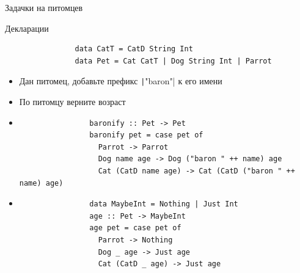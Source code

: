    \begin{frame}[fragile]{Задачки на питомцев}
        \begin{block}{Декларации}
            \begin{verbatim}
                data CatT = CatD String Int
                data Pet = Cat CatT | Dog String Int | Parrot
            \end{verbatim}
        \end{block}
        \begin{itemize}
            \item[\todo] Дан питомец, добавьте префикс \texttt|"baron"| к его имени
            \item[\todo] По питомцу верните возраст
            \item[\answer] \pause
            \begin{verbatim}
                baronify :: Pet -> Pet
                baronify pet = case pet of
                  Parrot -> Parrot
                  Dog name age -> Dog ("baron " ++ name) age
                  Cat (CatD name age) -> Cat (CatD ("baron " ++ name) age)
            \end{verbatim}
            \item[\answer] \pause
            \begin{verbatim}
                data MaybeInt = Nothing | Just Int
                age :: Pet -> MaybeInt
                age pet = case pet of
                  Parrot -> Nothing
                  Dog _ age -> Just age
                  Cat (CatD _ age) -> Just age
            \end{verbatim}
        \end{itemize}
    \end{frame}

